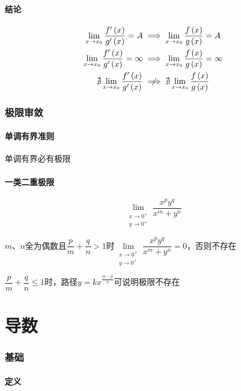 \documentclass{article}
\begin{document}
\subsection{结论}

\[\begin{aligned}
        \lim_{x\to x_0}\frac{f^\prime\p{x}}{g^\prime\p{x}}=A       & \implies\lim_{x\to x_0}\frac{f\p{x}}{g\p{x}}=A                 \\
        \lim_{x\to x_0}\frac{f^\prime\p{x}}{g^\prime\p{x}}=\infty  & \implies\lim_{x\to x_0}\frac{f\p{x}}{g\p{x}}=\infty            \\
        \nexists\lim_{x\to x_0}\frac{f^\prime\p{x}}{g^\prime\p{x}} & \centernot\implies\nexists\lim_{x\to x_0}\frac{f\p{x}}{g\p{x}}
    \end{aligned}\]

\section{极限审敛}

\subsection{单调有界准则}

单调有界必有极限

\subsection{一类二重极限}

\[\lim_{\substack{x\to0^+ \\ y\to0^+}}\frac{x^py^q}{x^m+y^n}\]

$m$、$n$全为偶数且$\dfrac pm+\dfrac qn>1$时$\lim\limits_{\substack{x\to0^+ \\ y\to0^+}}\dfrac{x^py^q}{x^m+y^n}=0$，否则不存在

$\dfrac pm+\dfrac qn\leqslant1$时，路径$y=kx^{\frac{m-p}q}$可说明极限不存在

\part{导数}

\section{基础}

\subsection{定义}
\end{document}
